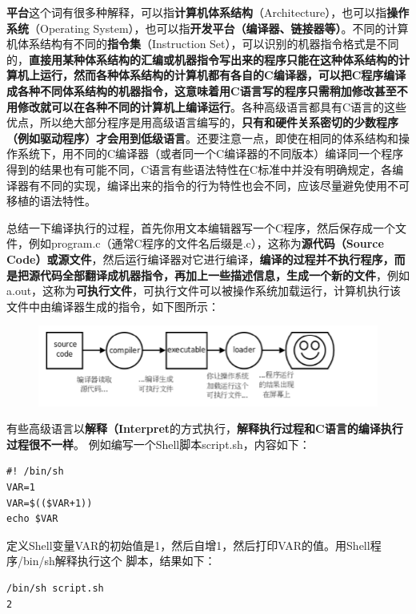 \documentclass[12pt]{book}
\begin{document}
\textbf{平台}这个词有很多种解释，可以指\textbf{计算机体系结构}（Architecture），也可以指\textbf{操作系统}（Operating
System），也可以指\textbf{开发平台（编译器、链接器等）}。不同的计算机体系结构有不同的\textbf{指令集}（Instruction
Set），可以识别的机器指令格式是不同的，\textbf{直接用某种体系结构的汇编或机器指令写出来的程序只能在这种体系结构的计算机上运行，然而各种体系结构的计算机都有各自的C编译器，可以把C程序编译成各种不同体系结构的机器指令，这意味着用C语言写的程序只需稍加修改甚至不用修改就可以在各种不同的计算机上编译运行}。各种高级语言都具有C语言的这些优点，所以绝大部分程序是用高级语言编写的，\textbf{只有和硬件关系密切的少数程序（例如驱动程序）才会用到低级语言}。还要注意一点，即使在相同的体系结构和操作系统下，用不同的C编译器（或者同一个C编译器的不同版本）编译同一个程序得到的结果也有可能不同，C语言有些语法特性在C标准中并没有明确规定，各编译器有不同的实现，编译出来的指令的行为特性也会不同，应该尽量避免使用不可移植的语法特性。

总结一下编译执行的过程，首先你用文本编辑器写一个C程序，然后保存成一个文件，例如program.c（通常C程序的文件名后缀是.c），这称为\textbf{源代码（Source
Code）或源文件}，然后运行编译器对它进行编译，\textbf{编译的过程并不执行程序，而是把源代码全部翻译成机器指令，再加上一些描述信息，生成一个新的文件}，例如a.out，这称为\textbf{可执行文件}，可执行文件可以被操作系统加载运行，计算机执行该文件中由编译器生成的指令，如下图所示：

\begin{figure}[H]
\centering
\includegraphics[scale=0.5]{image//C语言入门//程序的基本概念//2.png}
\end{figure}

有些高级语言以\textbf{解释（Interpret}的方式执行，\textbf{解释执行过程和C语言的编译执行过程很不一样}。
例如编写一个Shell脚本script.sh，内容如下：
\begin{verbatim}
#! /bin/sh
VAR=1
VAR=$(($VAR+1))
echo $VAR
\end{verbatim}

定义Shell变量VAR的初始值是1，然后自增1，然后打印VAR的值。用Shell程序/bin/sh解释执行这个
脚本，结果如下：
\begin{verbatim}
/bin/sh script.sh
2
\end{verbatim}
\end{document}
